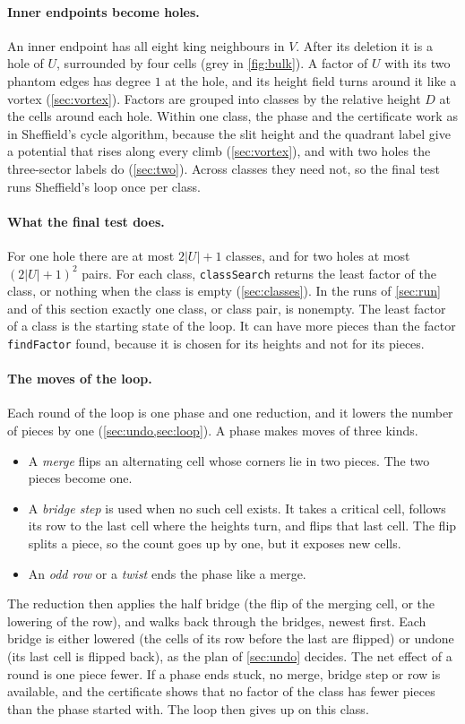 \documentclass[11pt]{article}
\theoremstyle{plain}
\theoremstyle{definition}
\theoremstyle{remark}
\newcommand{\lean}[1]{\texttt{#1}}
\begin{document}
\paragraph{Inner endpoints become holes.}
An inner endpoint has all eight king neighbours in $V$.
After its deletion it is a hole of $U$, surrounded by four cells (grey in \cref{fig:bulk}).
A factor of $U$ with its two phantom edges has degree $1$ at the hole, and its height field turns
around it like a vortex (\cref{sec:vortex}).
Factors are grouped into classes by the relative height $D$ at the cells around each hole.
Within one class, the phase and the certificate work as in Sheffield's cycle algorithm, because
the slit height and the quadrant label give a potential that rises along every climb
(\cref{sec:vortex}), and with two holes the three-sector labels do (\cref{sec:two}).
Across classes they need not, so the final test runs Sheffield's loop once per class.

\paragraph{What the final test does.}
For one hole there are at most $2|U|+1$ classes, and for two holes at most $(2|U|+1)^2$ pairs.
For each class, \lean{classSearch} returns the least factor of the class, or nothing when the class is
empty (\cref{sec:classes}).
In the runs of \cref{sec:run} and of this section exactly one class, or class pair, is nonempty.
The least factor of a class is the starting state of the loop.
It can have more pieces than the factor \lean{findFactor} found, because it is chosen for its heights
and not for its pieces.

\paragraph{The moves of the loop.}
Each round of the loop is one phase and one reduction, and it lowers the number of pieces by one
(\cref{sec:undo,sec:loop}).
A phase makes moves of three kinds.
\begin{itemize}
\item A \emph{merge} flips an alternating cell whose corners lie in two pieces.
  The two pieces become one.
\item A \emph{bridge step} is used when no such cell exists.
  It takes a critical cell, follows its row to the last cell where the heights turn, and flips that
  last cell.
  The flip splits a piece, so the count goes up by one, but it exposes new cells.
\item An \emph{odd row} or a \emph{twist} ends the phase like a merge.
\end{itemize}
The reduction then applies the half bridge (the flip of the merging cell, or the lowering of the
row), and walks back through the bridges,
newest first.
Each bridge is either lowered (the cells of its row before the last are flipped) or undone (its last
cell is flipped back), as the plan of \cref{sec:undo} decides.
The net effect of a round is one piece fewer.
If a phase ends stuck, no merge, bridge step or row is available, and the certificate shows that no
factor of the class has fewer pieces than the phase started with.
The loop then gives up on this class.
\end{document}
